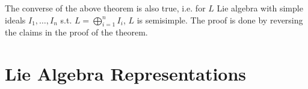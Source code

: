 \documentclass{article}
\begin{document}
\begin{corollary}
    The converse of the above theorem is also true, i.e. for $L$ Lie algebra with simple ideals $I_1, \dots, I_n$ s.t. $L = \bigoplus_{i = 1}^n I_i$, $L$ is semisimple. The proof is done by reversing the claims in the proof of the theorem.
\end{corollary}

\section{Lie Algebra Representations}
\end{document}
